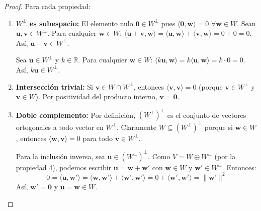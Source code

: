 \begin{proof} Para cada propiedad:
\begin{enumerate}
    \item \textbf{$W^\perp$ es subespacio:} El elemento nulo $\mathbf{0} \in W^\perp$ pues $\langle \mathbf{0}, \mathbf{w} \rangle = 0$ $\forall \mathbf{w} \in W.$ Sean $\mathbf{u}, \mathbf{v} \in W^\perp$. Para cualquier $\mathbf{w} \in W$: \(
        \langle \mathbf{u} + \mathbf{v}, \mathbf{w} \rangle = \langle \mathbf{u}, \mathbf{w} \rangle + \langle \mathbf{v}, \mathbf{w} \rangle = 0 + 0 = 0.\) Así, $\mathbf{u} + \mathbf{v} \in W^\perp$.
        
Sea $\mathbf{u} \in W^\perp$ y $k \in \mathbb{R}$. Para cualquier $\mathbf{w} \in W$: \(\langle k\mathbf{u}, \mathbf{w} \rangle = k \langle \mathbf{u}, \mathbf{w} \rangle = k \cdot 0 = 0.\)
        Así, $k\mathbf{u} \in W^\perp$.

    
    \item \textbf{Intersección trivial:} 
    Si $\mathbf{v} \in W \cap W^\perp$, entonces $\langle \mathbf{v}, \mathbf{v} \rangle = 0$ (porque $\mathbf{v} \in W^\perp$ y $\mathbf{v} \in W$). Por positividad del producto interno, $\mathbf{v} = \mathbf{0}$.
    
    \item \textbf{Doble complemento:} 
    Por definición, $(W^\perp)^\perp$ es el conjunto de vectores ortogonales a todo vector en $W^\perp$. Claramente $W \subseteq (W^\perp)^\perp$ porque si $\mathbf{w} \in W$, entonces $\langle \mathbf{w}, \mathbf{v} \rangle = 0$ para todo $\mathbf{v} \in W^\perp$. 
    
    Para la inclusión inversa, sea $\mathbf{u} \in (W^\perp)^\perp$. Como $V = W \oplus W^\perp$ (por la propiedad 4), podemos escribir $\mathbf{u} = \mathbf{w} + \mathbf{w}'$ con $\mathbf{w} \in W$ y $\mathbf{w}' \in W^\perp$. Entonces:
    \[
    0 = \langle \mathbf{u}, \mathbf{w}' \rangle = \langle \mathbf{w}, \mathbf{w}' \rangle + \langle \mathbf{w}', \mathbf{w}' \rangle = 0 + \langle \mathbf{w}', \mathbf{w}' \rangle = \| \mathbf{w}' \|^2
    \]
    Así, $\mathbf{w}' = \mathbf{0}$ y $\mathbf{u} = \mathbf{w} \in W$.
    

\end{enumerate}
\end{proof}
